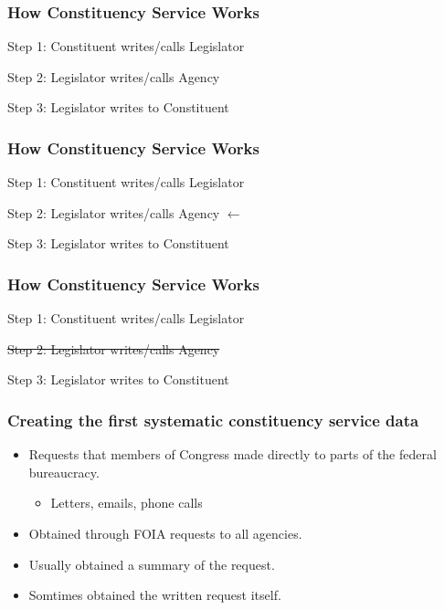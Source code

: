 \documentclass[13pt]{beamer}
\begin{document}
\begin{frame}
\frametitle{How Constituency Service Works}
\Large
Step 1: Constituent writes/calls Legislator
\bigskip

Step 2: Legislator writes/calls Agency  

\bigskip
Step 3: Legislator writes to Constituent



\end{frame}
\begin{frame}
\frametitle{How Constituency Service Works}
\Large
Step 1: Constituent writes/calls Legislator
\bigskip

Step 2: Legislator writes/calls Agency \hspace{1cm} \textbf{\alert{$\longleftarrow$}}

\bigskip
Step 3: Legislator writes to Constituent



\end{frame}
\begin{frame}
\frametitle{How Constituency Service Works}
\Large
Step 1: Constituent writes/calls Legislator
\bigskip

\sout{Step 2: Legislator writes/calls Agency }

\bigskip
Step 3: Legislator writes to Constituent



\end{frame}


\begin{frame}
\frametitle{Creating the first systematic constituency service data}
\Large
\begin{itemize}
\item Requests that members of Congress made directly to parts of the federal bureaucracy.
\begin{itemize}
\item Letters, emails, phone calls
\end{itemize}
\item Obtained through FOIA requests to all agencies.
\item Usually obtained a summary of the request.
\item Somtimes obtained the written request itself.
\end{itemize}
\end{frame}
\end{document}
